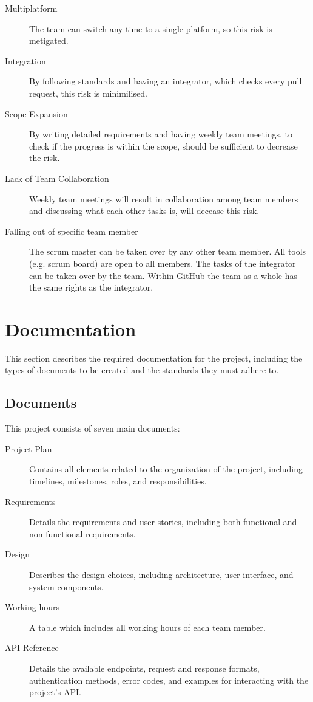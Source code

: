 \documentclass{projdoc}
\begin{document}
\begin{description}
	\item[Multiplatform] The team can switch any time to a single platform, so this
		risk is metigated.
	\item[Integration] By following standards and having an integrator, which checks
		every pull request, this risk is minimilised.
	\item[Scope Expansion] By writing detailed requirements and having weekly team
		meetings, to check if the progress is within the scope, should be sufficient to
		decrease the risk.
	\item[Lack of Team Collaboration] Weekly team meetings will result in collaboration among team members and discussing what each other tasks is, will decease this risk.
	\item[Falling out of specific team member] The scrum master can be taken over by any other team member. All tools (e.g. scrum board) are open to all members. The tasks of the integrator can be taken over by the team. Within GitHub the team as a whole has the same rights as the integrator.
\end{description}

\section{Documentation}

This section describes the required documentation for the project, including the
types of documents to be created and the standards they must adhere to.

\subsection{Documents}

This project consists of seven main documents:\noparbreak
\begin{description}
	\item[Project Plan] Contains all elements related to the organization of the
		project, including timelines, milestones, roles, and responsibilities.
	\item[Requirements] Details the requirements and user stories, including both
		functional and non-functional requirements.
	\item[Design] Describes the design choices, including architecture, user interface,
		and system components.
	\item[Working hours] A table which includes all working hours of each team member.
	\item[API Reference] Details the available endpoints, request and response formats,
		authentication methods, error codes, and examples for interacting with the
		project's API.
\end{description}
\end{document}
